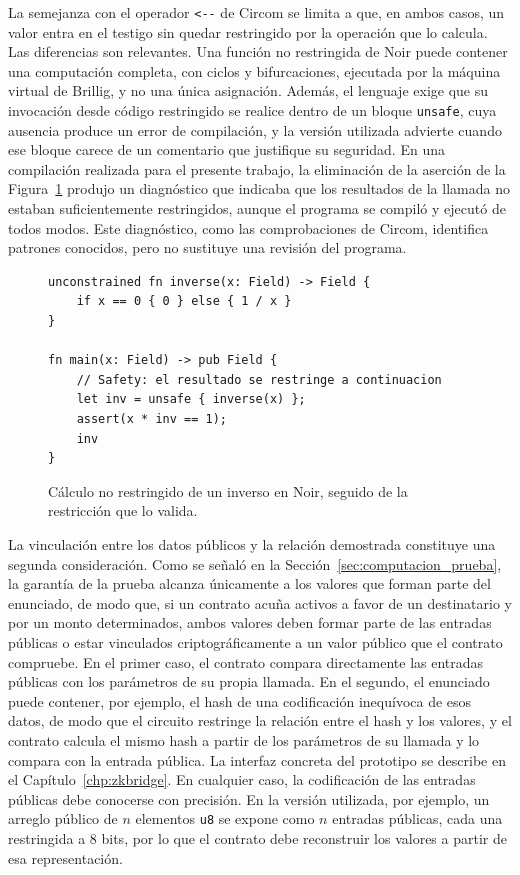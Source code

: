 La semejanza con el operador \lstinline|<--| de Circom se limita a que, en ambos casos, un valor
entra en el testigo sin quedar restringido por la operación que lo calcula. Las diferencias son
relevantes. Una función no restringida de Noir puede contener una computación completa, con
ciclos y bifurcaciones, ejecutada por la máquina virtual de Brillig, y no una única asignación.
Además, el lenguaje exige que su invocación desde código restringido se realice dentro de un
bloque \lstinline|unsafe|, cuya ausencia produce un error de compilación, y la versión utilizada
advierte cuando ese bloque carece de un comentario que justifique su seguridad. En una
compilación realizada para el presente trabajo, la eliminación de la aserción de la
Figura~\ref{fig:noir_unconstrained} produjo un diagnóstico que indicaba que los resultados de la
llamada no estaban suficientemente restringidos, aunque el programa se compiló y ejecutó de todos
modos. Este diagnóstico, como las comprobaciones de Circom, identifica patrones conocidos, pero no
sustituye una revisión del programa.

\begin{figure}[htbp]
	\centering
	\begin{minipage}{0.8\textwidth}
		\begin{lstlisting}[language=Noir]
unconstrained fn inverse(x: Field) -> Field {
    if x == 0 { 0 } else { 1 / x }
}

fn main(x: Field) -> pub Field {
    // Safety: el resultado se restringe a continuacion
    let inv = unsafe { inverse(x) };
    assert(x * inv == 1);
    inv
}
\end{lstlisting}
	\end{minipage}
	\caption{Cálculo no restringido de un inverso en Noir, seguido de la restricción que lo
	valida.}
	\label{fig:noir_unconstrained}
\end{figure}

La vinculación entre los datos públicos y la relación demostrada constituye una segunda
consideración. Como se señaló en la Sección~\ref{sec:computacion_prueba}, la garantía de la prueba
alcanza únicamente a los valores que forman parte del enunciado, de modo que, si un contrato
acuña activos a favor de un destinatario y por un monto determinados, ambos valores deben formar
parte de las entradas públicas o estar vinculados criptográficamente a un valor público que el
contrato compruebe. En el primer caso, el contrato compara directamente las entradas públicas con
los parámetros de su propia llamada. En el segundo, el enunciado puede contener, por ejemplo, el
hash de una codificación inequívoca de esos datos, de modo que el circuito restringe la relación
entre el hash y los valores, y el contrato calcula el mismo hash a partir de los parámetros de su
llamada y lo compara con la entrada pública. La interfaz concreta del prototipo se describe en el
Capítulo~\ref{chp:zkbridge}. En cualquier caso, la codificación de las entradas públicas debe
conocerse con precisión. En la versión utilizada, por ejemplo,
un arreglo público de $n$ elementos \lstinline|u8| se expone como $n$ entradas públicas, cada una
restringida a 8 bits, por lo que el contrato debe reconstruir los valores a partir de esa
representación.

